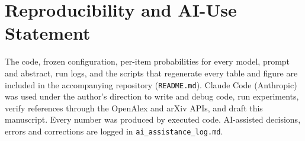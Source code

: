 \section*{Reproducibility and AI-Use Statement}
The code, frozen configuration, per-item probabilities for every model, prompt and abstract, run logs, and the scripts that regenerate every table and figure are included in the accompanying repository (\texttt{README.md}). Claude Code (Anthropic) was used under the author's direction to write and debug code, run experiments, verify references through the OpenAlex and arXiv APIs, and draft this manuscript. Every number was produced by executed code. AI-assisted decisions, errors and corrections are logged in \texttt{ai\_assistance\_log.md}.
